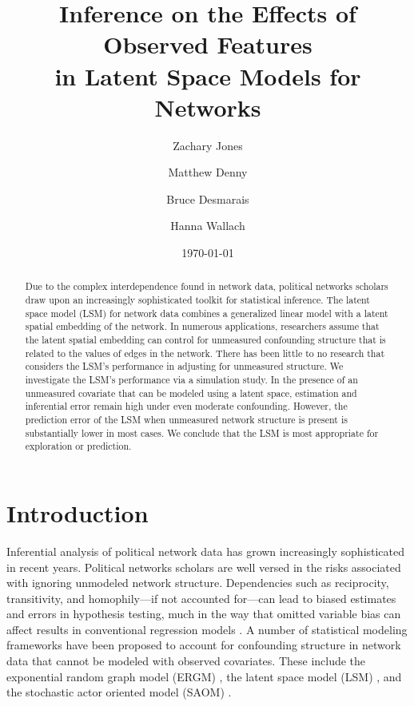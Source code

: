 \documentclass[11pt]{article}
\title{\vspace{-2cm} Inference on the Effects of Observed Features
\\ in Latent Space Models for Networks }
\author{ Zachary Jones \and Matthew Denny \and Bruce Desmarais \and Hanna Wallach} \date{\today}
\begin{document}
\maketitle




\begin{abstract}

\noindent Due to the complex interdependence found in network data,
political networks scholars draw upon an increasingly sophisticated
toolkit for statistical inference. The latent space model (LSM) for
network data combines a generalized linear model with a latent spatial
embedding of the network. In numerous applications, researchers assume
that the latent spatial embedding can control for unmeasured
confounding structure that is related to the values of edges in the
network. There has been little to no research that considers the LSM's
performance in adjusting for unmeasured structure. We investigate the
LSM's performance via a simulation study. In the presence of an
unmeasured covariate that can be modeled using a latent space,
estimation and inferential error remain high under even moderate
confounding. However, the prediction error of the LSM when unmeasured
network structure is present is substantially lower in most cases. We
conclude that the LSM is most appropriate for exploration or
prediction.
\end{abstract}
\thispagestyle{empty}
\section{Introduction}

Inferential analysis of political network data has grown increasingly
sophisticated in recent years. Political networks scholars are well
versed in the risks associated with ignoring unmodeled network
structure. Dependencies such as reciprocity, transitivity, and
homophily---if not accounted for---can lead to biased estimates and
errors in hypothesis testing, much in the way that omitted variable
bias can affect results in conventional regression models
\citep{ward2007disputes,kinne2014,cranmerisq,hays2010spatial}. A
number of statistical modeling frameworks have been proposed to
account for confounding structure in network data that cannot be
modeled with observed covariates. These include the exponential random
graph model (ERGM) \citep[e.g.,
][]{lazer2010,cranmer2011pa,desmarais2012psj}, the latent space model
(LSM) \citep[e.g.,
][]{ward2007disputes,ward2007persistent,kirkland2012multimember}, and
the stochastic actor oriented model (SAOM) \citep[e.g.,
][]{berardo2010ajps,kinne2014}.
\end{document}
